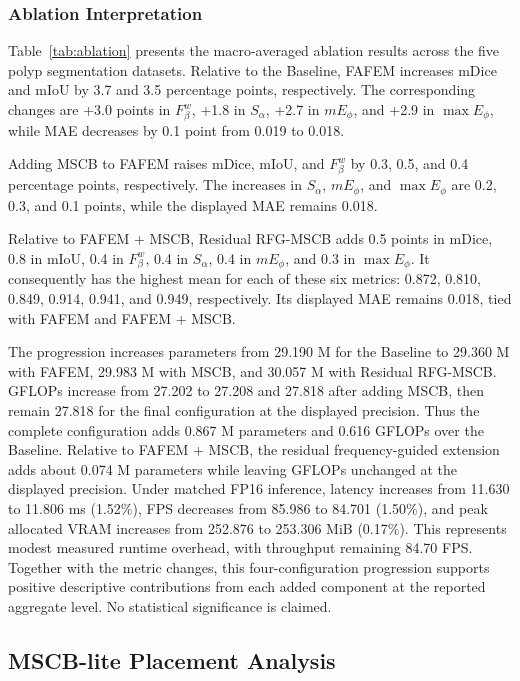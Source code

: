 \subsubsection{Ablation Interpretation}

Table~\ref{tab:ablation} presents the macro-averaged ablation results across the five polyp segmentation datasets. Relative to the Baseline, FAFEM increases mDice and mIoU by 3.7 and 3.5 percentage points, respectively. The corresponding changes are +3.0 points in $F_{\beta}^{w}$, +1.8 in $S_{\alpha}$, +2.7 in $mE_{\phi}$, and +2.9 in $\max E_{\phi}$, while MAE decreases by 0.1 point from 0.019 to 0.018.

Adding MSCB to FAFEM raises mDice, mIoU, and $F_{\beta}^{w}$ by 0.3, 0.5, and 0.4 percentage points, respectively. The increases in $S_{\alpha}$, $mE_{\phi}$, and $\max E_{\phi}$ are 0.2, 0.3, and 0.1 points, while the displayed MAE remains 0.018.

Relative to FAFEM + MSCB, Residual RFG-MSCB adds 0.5 points in mDice, 0.8 in mIoU, 0.4 in $F_{\beta}^{w}$, 0.4 in $S_{\alpha}$, 0.4 in $mE_{\phi}$, and 0.3 in $\max E_{\phi}$. It consequently has the highest mean for each of these six metrics: 0.872, 0.810, 0.849, 0.914, 0.941, and 0.949, respectively. Its displayed MAE remains 0.018, tied with FAFEM and FAFEM + MSCB.

The progression increases parameters from 29.190 M for the Baseline to 29.360 M with FAFEM, 29.983 M with MSCB, and 30.057 M with Residual RFG-MSCB. GFLOPs increase from 27.202 to 27.208 and 27.818 after adding MSCB, then remain 27.818 for the final configuration at the displayed precision. Thus the complete configuration adds 0.867 M parameters and 0.616 GFLOPs over the Baseline. Relative to FAFEM + MSCB, the residual frequency-guided extension adds about 0.074 M parameters while leaving GFLOPs unchanged at the displayed precision. Under matched FP16 inference, latency increases from 11.630 to 11.806 ms (1.52\%), FPS decreases from 85.986 to 84.701 (1.50\%), and peak allocated VRAM increases from 252.876 to 253.306 MiB (0.17\%). This represents modest measured runtime overhead, with throughput remaining 84.70 FPS. Together with the metric changes, this four-configuration progression supports positive descriptive contributions from each added component at the reported aggregate level. No statistical significance is claimed.

\subsection{MSCB-lite Placement Analysis}
\label{mscb-placement}

